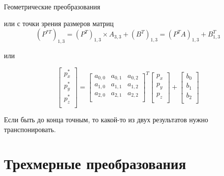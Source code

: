 \documentclass{beamer}
\begin{document}
\begin{frame}{Геометрические преобразования}
{		или с точки зрения размеров матриц
		\[
			(P^{*T})_{1,3}
			=(P^T)_{1,3} \times A_{3,3}+(B^T)_{1,3} 
			=(P^TA)_{1,3}+B_{1,3}^T 
			\]

		или 

		\[
			\begin{bmatrix}
				p_x^{*} \\
				p_y^{*} \\
				p_z^{*} \\
			\end{bmatrix}
			=
			\begin{bmatrix}
				a_{0,0} & a_{0,1} & a_{0,2}  \\
				a_{1,0} & a_{1,1} & a_{1,2}  \\
				a_{2,0} & a_{2,1} & a_{2,2}  \\
			\end{bmatrix}^T
			\begin{bmatrix}
				p_x \\
				p_y \\
				p_z \\
			\end{bmatrix}
			+
			\begin{bmatrix}
				b_0 \\
				b_1 \\
				b_2 \\
			\end{bmatrix}
		\]

		Если быть до конца точным, то какой-то из двух результатов нужно транспонировать.
		}
	\end{frame}

	\section{Трехмерные преобразования}
\end{document}
